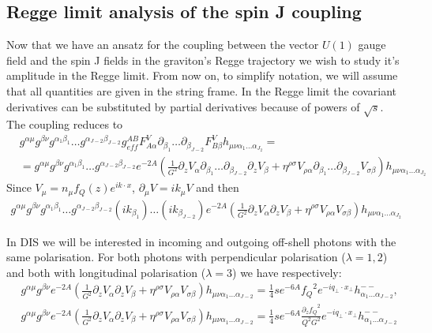 \documentclass[a4paper,12pt]{article}
\begin{document}
\subsection{Regge limit analysis of the spin J coupling}
Now that we have an ansatz for the coupling between the vector $U(1)$ gauge field and the spin J fields in the graviton's Regge trajectory we wish to study it's amplitude in the Regge limit. From now on, to simplify notation, we will assume that all quantities are given in the string frame. In the Regge limit the covariant derivatives can be substituted by partial derivatives because of powers of $\sqrt{s}$. The coupling reduces to
\begin{align}
&g^{\alpha \mu} g^{\beta \nu} g^{\alpha_1 \beta_1} \dots g^{\alpha_{J-2} \beta_{J-2}} g^{AB}_{eff} F^{V}_{A \alpha} \partial_{\beta_1} \dots \partial_{\beta_{J-2}} F^{V}_{B \beta} h_{\mu \nu \alpha_1 \dots \alpha_{J_2}} = \\
& = g^{\alpha \mu} g^{\beta \nu} g^{\alpha_1 \beta_1} \dots g^{\alpha_{J-2} \beta_{J-2}} e^{-2A} \left( \frac{1}{G^2} \partial_z V_\alpha \partial_{\beta_1} \dots \partial_{\beta_{J-2}} \partial_z V_\beta + \eta^{\rho \sigma} V_{\rho \alpha} \partial_{\beta_1} \dots \partial_{\beta_{J-2}} V_{\sigma \beta} \right) h_{\mu \nu \alpha_1 \dots \alpha_{J_2}}
\end{align}
Since $V_\mu = n_\mu f_Q \left( z\right) e^{i k \cdot x}$, $\partial_\mu V = i k_\mu V$ and then
\begin{align}
g^{\alpha \mu} g^{\beta \nu} g^{\alpha_1 \beta_1} \dots g^{\alpha_{J-2} \beta_{J-2}} \left( i k_{\beta_1}\right) \dots  \left( i k_{\beta_{J-2}}\right) e^{-2A} \left( \frac{1}{G^2} \partial_z V_\alpha  \partial_z V_\beta + \eta^{\rho \sigma} V_{\rho \alpha} V_{\sigma \beta} \right) h_{\mu \nu \alpha_1 \dots \alpha_{J_2}}
\end{align}

In DIS we will be interested in incoming and outgoing  off-shell photons with the same polarisation. For both photons with perpendicular polarisation ($\lambda = 1, 2$) and both with longitudinal polarisation ($\lambda = 3$) we have respectively:
\begin{align}
&g^{\alpha \mu} g^{\beta \nu} e^{-2 A} \left( \frac{1}{G^2} \partial_z V_\alpha \partial_z V_\beta + \eta^{\rho \sigma} V_{\rho \alpha} V_{\sigma \beta} \right) h_{\mu \nu \alpha_1 \dots \alpha_{J-2}} = \frac{1}{4} s e^{-6A} {f_Q}^2 e^{-i q_\perp \cdot x_\perp} h^{--}_{\alpha_1 \dots \alpha_{J-2}}, \\
&g^{\alpha \mu} g^{\beta \nu} e^{-2 A} \left( \frac{1}{G^2} \partial_z V_\alpha \partial_z V_\beta + \eta^{\rho \sigma} V_{\rho \alpha} V_{\sigma \beta} \right) h_{\mu \nu \alpha_1 \dots \alpha_{J-2}} = \frac{1}{4} s e^{-6A} \frac{{\partial_z f_Q}^2}{Q^2 G^2} e^{-i q_\perp \cdot x_\perp} h^{--}_{\alpha_1 \dots \alpha_{J-2}}
\end{align}
\end{document}
